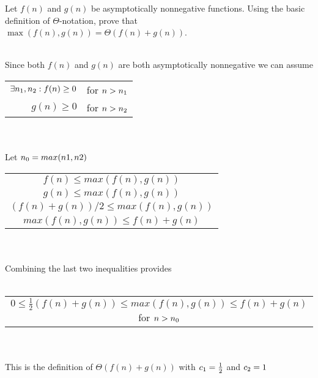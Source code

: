 \documentclass[addpoints,11pt]{exam}
\begin{document}
\begin{questions}
		\ifprintanswers
		\newpage
		\else
		\bigskip
		\fi
		
		
		\question[5]
		Let $f(n)$ and $g(n)$ be asymptotically nonnegative functions.  Using the basic definition of $\Theta$-notation, prove that $\max(f(n),g(n)) = \Theta(f(n)+g(n))$.
		\begin{solutionorbox}\\
			Since both $f(n)$ and $g(n)$ are both asymptotically nonnegative we can assume\\
			\begin{tabular}{r l}
				$\exists n\textsubscript{1},n\textsubscript{2}: f(n) \geq 0 $ & for $ n > n\textsubscript{1}$\\
				$g(n) \geq 0$ & for $ n > n\textsubscript{2}$\\ 
			\end{tabular}\\ \\
			Let $n\textsubscript{0} = max(n1, n2)$\\
			\begin{tabular}{c}
				$f(n) \leq max(f(n),g(n))$\\
				$g(n) \leq max(f(n),g(n))$\\
				$(f(n) + g(n))/2 \leq max(f(n),g(n))$\\
				$max(f(n),g(n)) \leq f(n) + g(n)$
			\end{tabular}\\ \\
			Combining the last two inequalities provides\\ \\
			\begin{tabular}{c}
				$0 \leq \frac{1}{2}(f(n) + g(n)) \leq max(f(n),g(n)) \leq f(n) + g(n)$ for $n > n\textsubscript{0}$
			\end{tabular}\\ \\
			This is the definition of $\Theta(f(n)+g(n))$ with $c\textsubscript{1} = \frac{1}{2} $ and $ c\textsubscript{2} = 1$
			
		\end{solutionorbox}
		
		\ifprintanswers
		\newpage
		\else
		\bigskip
		\fi
		

\end{questions}
\end{document}
